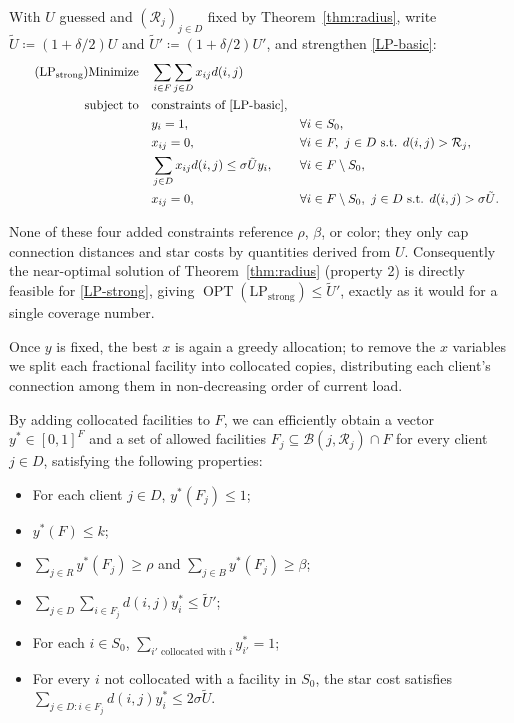 \documentclass[a4paper,11pt]{article}
\DeclareMathOperator{\OPT}{OPT}
\begin{document}
With $U$ guessed and $(\mathcal{R}_j)_{j\in D}$ fixed by Theorem~\ref{thm:radius},
write $\tilde U \coloneqq (1+\delta/2)U$ and $\tilde U' \coloneqq
(1+\delta/2)U'$, and strengthen \eqref{LP-basic}:
\begin{align} \tag{$\text{LP}_{\text{strong}}$} \label{LP-strong}
\text{Minimize} \quad &\sum_{i \in F} \sum_{j \in D} x_{ij} d(i,j) \\
\text{subject to} \quad &\text{constraints of } \eqref{LP-basic}, \nonumber \\
& y_i = 1, \quad &&\forall i \in S_0, \nonumber \\
& x_{ij} = 0, \quad &&\forall i \in F, \ j \in D \text{ s.t. } d(i,j) > \mathcal{R}_j, \nonumber \\
& \sum_{j \in D} x_{ij} d(i,j) \leq \sigma \tilde{U} y_i, \quad &&\forall i \in F \setminus S_0, \nonumber \\
& x_{ij} = 0, \quad &&\forall i \in F \setminus S_0, \ j \in D \text{ s.t. } d(i,j) > \sigma \tilde{U}. \nonumber
\end{align}

\begin{remark}
None of these four added constraints reference $\rho$, $\beta$, or
color; they only cap connection distances and star costs by quantities
derived from $U$. Consequently the near-optimal solution of
Theorem~\ref{thm:radius} (property 2) is directly feasible for
\eqref{LP-strong}, giving $\OPT(\text{LP}_{\text{strong}}) \le \tilde
U'$, exactly as it would for a single coverage number.
\end{remark}

Once $y$ is fixed, the best $x$ is again a greedy allocation; to remove
the $x$ variables we split each fractional facility into collocated
copies, distributing each client's connection among them in
non-decreasing order of current load.

\begin{lemma}
\label{lem:eliminate_x}
By adding collocated facilities to $F$, we can efficiently obtain a
vector $y^* \in [0,1]^F$ and a set of allowed facilities $F_j \subseteq
\mathcal{B}(j, \mathcal{R}_j) \cap F$ for every client $j \in D$, satisfying the
following properties:
\begin{itemize}
\item[(a)] For each client $j \in D$, $y^*(F_j) \leq 1$;
\item[(b)] $y^*(F) \leq k$;
\item[(c)] $\sum_{j \in R} y^*(F_j) \geq \rho$ and $\sum_{j \in B}
y^*(F_j) \geq \beta$;
\item[(d)] $\sum_{j \in D} \sum_{i \in F_j} d(i, j) y^*_i \leq \tilde{U}'$;
\item[(e)] For each $i \in S_0$, $\sum_{i' \text{ collocated with } i}
y^*_{i'} = 1$;
\item[(f)] For every $i$ not collocated with a facility in $S_0$, the
star cost satisfies $\sum_{j \in D : i \in F_j} d(i, j) y^*_i \leq
2\sigma\tilde{U}$.
\end{itemize}
\end{lemma}
\end{document}
